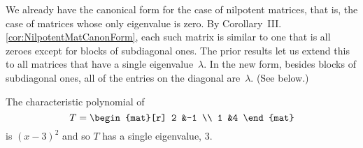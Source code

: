 We already have the canonical form for 
the case of nilpotent matrices, 
that is, the case of matrices whose only eigenvalue is zero.
By Corollary~III.\ref{cor:NilpotentMatCanonForm}, each 
such matrix is similar to one that is all
zeroes except for blocks of subdiagonal ones.
The prior results let us extend this to all
matrices that have a single eigenvalue~$\lambda$.
In the new form,
besides blocks of subdiagonal ones, all of the entries on the diagonal 
are~$\lambda$.
(See  below.)

\begin{example}   \label{ex:SingJordBlock}
The characteristic polynomial of
\begin{equation*}
  T=\begin{mat}[r]
      2  &-1  \\
      1  &4
    \end{mat}
\end{equation*}
is \( (x-3)^2 \) and so \( T \) has a single eigenvalue, \( 3 \).


\end{example}
